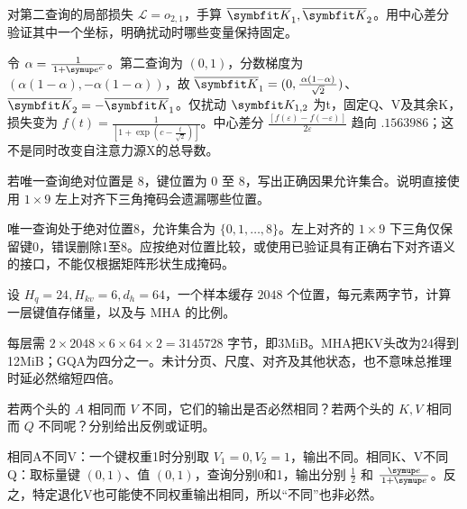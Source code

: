 \begin{exercises}
\begin{exercise}\optional 对第二查询的局部损失 $\mathcal L=o_{2,1}$，手算 $\overline{\mat{K}}_1,\overline{\mat{K}}_2$。用中心差分验证其中一个坐标，明确扰动时哪些变量保持固定。

\begin{solution}
令 $\alpha=\frac{1}{1+\conste{}^c}$。第二查询为 $(0,1)$，分数梯度为 $(\alpha(1-\alpha),-\alpha(1-\alpha))$，故 $\overline{\mat{K}}_1=(0,\frac{\alpha(1-\alpha)}{\sqrt2})$、$\overline{\mat{K}}_2=-\overline{\mat{K}}_1$。仅扰动 $\mat{K}_{1,2}$ 为t，固定Q、V及其余K，损失变为 $f(t)=\frac{1}{[1+\exp(c-\frac{t}{\sqrt2})]}$。中心差分 $\frac{[f(\varepsilon)-f(-\varepsilon)]}{2\varepsilon}$ 趋向 $.1563986$；这不是同时改变自注意力源X的总导数。
\end{solution}
\end{exercise}

\begin{exercise} 若唯一查询绝对位置是 $8$，键位置为 $0$ 至 $8$，写出正确因果允许集合。说明直接使用 $1\times9$ 左上对齐下三角掩码会遗漏哪些位置。

\begin{solution}
唯一查询处于绝对位置8，允许集合为 $\{0,1,\ldots,8\}$。左上对齐的 $1\times9$ 下三角仅保留键0，错误删除1至8。应按绝对位置比较，或使用已验证具有正确右下对齐语义的接口，不能仅根据矩阵形状生成掩码。
\end{solution}
\end{exercise}

\begin{exercise} 设 $H_q=24,H_{kv}=6,d_h=64$，一个样本缓存 $2048$ 个位置，每元素两字节，计算一层键值存储量，以及与 MHA 的比例。

\begin{solution}
每层需 $2\times2048\times6\times64\times2=3145728$ 字节，即3MiB。MHA把KV头改为24得到12MiB；GQA为四分之一。未计分页、尺度、对齐及其他状态，也不意味总推理时延必然缩短四倍。
\end{solution}
\end{exercise}

\begin{exercise}\optional 若两个头的 $A$ 相同而 $V$ 不同，它们的输出是否必然相同？若两个头的 $K,V$ 相同而 $Q$ 不同呢？分别给出反例或证明。

\begin{solution}
相同A不同V：一个键权重1时分别取 $V_1=0,V_2=1$，输出不同。相同K、V不同Q：取标量键 $(0,1)$、值 $(0,1)$，查询分别0和1，输出分别 $\frac{1}{2}$ 和 $\frac{\conste}{1+\conste}$。反之，特定退化V也可能使不同权重输出相同，所以“不同”也非必然。
\end{solution}
\end{exercise}


\end{exercises}
